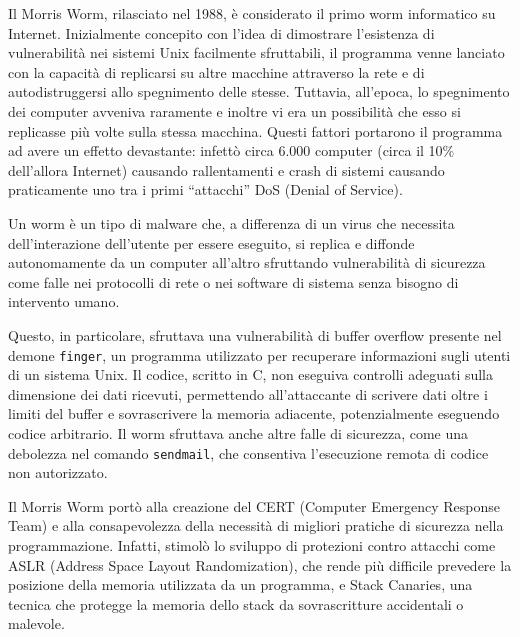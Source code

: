 Il Morris Worm, rilasciato nel 1988, è considerato il primo worm informatico su Internet.
Inizialmente concepito con l'idea di dimostrare l'esistenza di vulnerabilità nei sistemi Unix facilmente sfruttabili, il programma venne lanciato con la capacità di replicarsi su altre macchine attraverso la rete e di autodistruggersi allo spegnimento delle stesse. Tuttavia, all'epoca, lo spegnimento dei computer avveniva raramente e inoltre vi era un possibilità che esso si replicasse più volte sulla stessa macchina. Questi fattori portarono il programma ad avere un effetto devastante: infettò circa 6.000 computer (circa il 10\% dell'allora Internet) causando rallentamenti e crash di sistemi causando praticamente uno tra i primi ``attacchi'' DoS (Denial of Service).

Un worm è un tipo di malware che, a differenza di un virus che necessita dell'interazione dell'utente per essere eseguito, si replica e diffonde autonomamente da un computer all'altro sfruttando vulnerabilità di sicurezza come falle nei protocolli di rete o nei software di sistema senza bisogno di intervento umano.

Questo, in particolare, sfruttava una vulnerabilità di buffer overflow presente nel demone \texttt{finger}, un programma utilizzato per recuperare informazioni sugli utenti di un sistema Unix. Il codice, scritto in C, non eseguiva controlli adeguati sulla dimensione dei dati ricevuti, permettendo all'attaccante di scrivere dati oltre i limiti del buffer e sovrascrivere la memoria adiacente, potenzialmente eseguendo codice arbitrario. Il worm sfruttava anche altre falle di sicurezza, come una debolezza nel comando \texttt{sendmail}, che consentiva l'esecuzione remota di codice non autorizzato.

Il Morris Worm portò alla creazione del CERT (Computer Emergency Response Team) e alla consapevolezza della necessità di migliori pratiche di sicurezza nella programmazione. Infatti, stimolò lo sviluppo di protezioni contro attacchi come ASLR (Address Space Layout Randomization), che rende più difficile prevedere la posizione della memoria utilizzata da un programma, e Stack Canaries, una tecnica che protegge la memoria dello stack da sovrascritture accidentali o malevole.